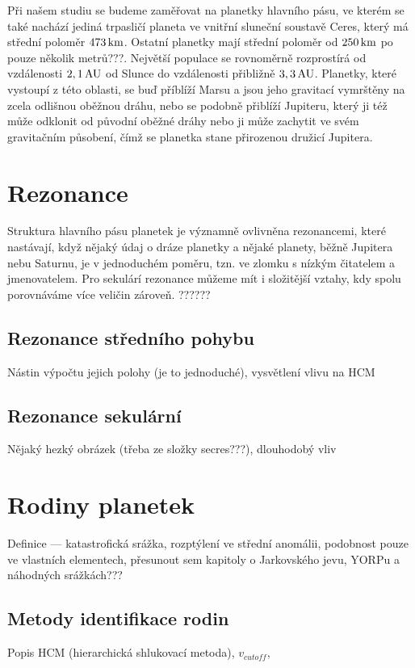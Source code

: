 \documentclass[A4paper, 12pt, oneside]{book}
\begin{document}
Při našem studiu se budeme zaměřovat na planetky hlavního pásu, ve kterém se také nachází jediná trpasličí planeta ve vnitřní sluneční soustavě Ceres, který má střední poloměr $473\, {\rm km}$. Ostatní planetky mají střední poloměr od $250\, {\rm km}$ po pouze několik metrů???. Největší populace se rovnoměrně rozprostírá od vzdálenosti $2,1\, {\rm AU}$ od Slunce do vzdálenosti přibližně $3,3\, {\rm AU}$. Planetky, které vystoupí z této oblasti, se buď příblíží Marsu a jsou jeho gravitací vymrštěny na zcela odlišnou oběžnou dráhu, nebo se podobně přiblíží Jupiteru, který ji též může odklonit od původní oběžné dráhy nebo ji může zachytit ve svém gravitačním působení, čímž se planetka stane přirozenou družicí Jupitera. 

\section{Rezonance}
Struktura hlavního pásu planetek je významně ovlivněna rezonancemi, které nastávají, když nějaký údaj o dráze planetky a nějaké planety, běžně Jupitera nebu Saturnu, je v jednoduchém poměru, tzn. ve zlomku s nízkým čitatelem a jmenovatelem. Pro sekulárí rezonance můžeme mít i složitější vztahy, kdy spolu porovnáváme více veličin zároveň. ??????
\subsection{Rezonance středního pohybu}
Nástin výpočtu jejich polohy (je to jednoduché), vysvětlení vlivu na HCM

\subsection{Rezonance sekulární} 
Nějaký hezký obrázek (třeba ze složky secres???), dlouhodobý vliv


\section{Rodiny planetek}
Definice --- katastrofická srážka, rozptýlení ve střední anomálii, podobnost pouze ve vlastních elementech, přesunout sem kapitoly o Jarkovského jevu, YORPu a náhodných srážkách???
\subsection{Metody identifikace rodin}
Popis HCM (hierarchická shlukovací metoda), $v_{cutoff}$, 
\end{document}
